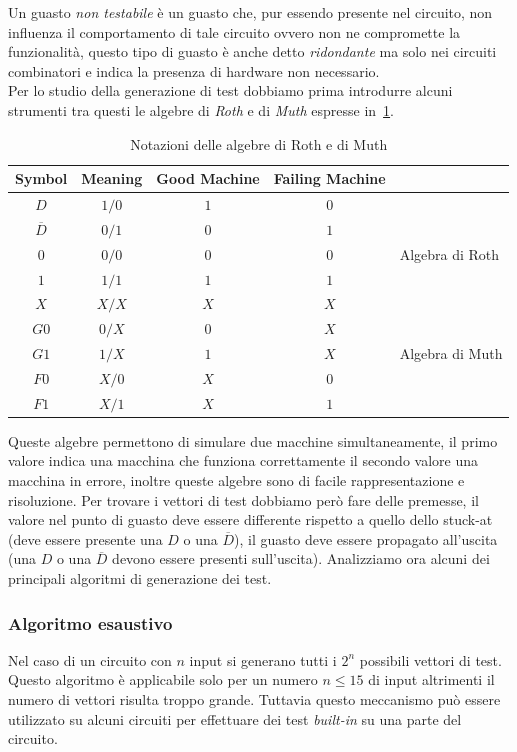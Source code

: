 Un guasto \emph{non testabile} è un guasto che, pur essendo presente nel circuito, non influenza il comportamento di tale circuito ovvero non ne compromette la funzionalità, questo tipo di guasto è anche detto \emph{ridondante} ma solo nei circuiti combinatori e indica la presenza di hardware non necessario.\\
Per lo studio della generazione di test dobbiamo prima introdurre alcuni strumenti tra questi le algebre di \emph{Roth} e di \emph{Muth} espresse in \tablename\,\ref{tab:rothmuth}.
\begin{table}
\centering
\begin{tabular}{|c|c|c|cl|}
\hline
Symbol & Meaning & Good Machine & Failing Machine & \\
\hline
$D$ & $1/0$ & $1$ & $0$ & \\
$\overline{D}$ & $0/1$ & $0$ & $1$ & \\
$0$ & $0/0$ & $0$ & $0$ & Algebra di Roth\\
$1$ & $1/1$ & $1$ & $1$ & \\
$X$ & $X/X$ & $X$ & $X$ & \\
\hline
$G0$ & $0/X$ & $0$ & $X$ & \\
$G1$ & $1/X$ & $1$ & $X$ & Algebra di Muth\\
$F0$ & $X/0$ & $X$ & $0$ & \\
$F1$ & $X/1$ & $X$ & $1$ & \\
\hline
\end{tabular}
\caption{Notazioni delle algebre di Roth e di Muth}\label{tab:rothmuth}
\end{table}
Queste algebre permettono di simulare due macchine simultaneamente, il primo valore indica una macchina che funziona correttamente il secondo valore una macchina in errore, inoltre queste algebre sono di facile rappresentazione e risoluzione. Per trovare i vettori di test dobbiamo però fare delle premesse, il valore nel punto di guasto deve essere differente rispetto a quello dello stuck-at (deve essere presente una $D$ o una $\overline{D}$), il guasto deve essere propagato all'uscita (una $D$ o una $\overline{D}$ devono essere presenti sull'uscita).
Analizziamo ora alcuni dei principali algoritmi di generazione dei test.
\subsubsection{Algoritmo esaustivo}
Nel caso di un circuito con $n$ input si generano tutti i $2^n$ possibili vettori di test. Questo algoritmo è applicabile solo per un numero $n\leq 15$ di input altrimenti il numero di vettori risulta troppo grande. Tuttavia questo meccanismo può essere utilizzato su alcuni circuiti per effettuare dei test \emph{built-in} su una parte del circuito.
